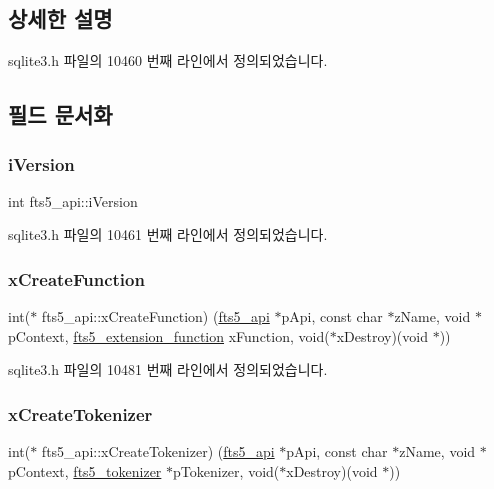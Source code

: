 \subsection{상세한 설명}


sqlite3.\+h 파일의 10460 번째 라인에서 정의되었습니다.



\subsection{필드 문서화}
\mbox{\label{structfts5__api_a3c338289abb33e1805da870172956a7c}} 
\subsubsection{\texorpdfstring{i\+Version}{iVersion}}
{\footnotesize\ttfamily int fts5\+\_\+api\+::i\+Version}



sqlite3.\+h 파일의 10461 번째 라인에서 정의되었습니다.

\mbox{\label{structfts5__api_acf1a0612be3b91b908f38ecbc6735d17}} 
\subsubsection{\texorpdfstring{x\+Create\+Function}{xCreateFunction}}
{\footnotesize\ttfamily int($\ast$ fts5\+\_\+api\+::x\+Create\+Function) (\hyperlink{structfts5__api}{fts5\+\_\+api} $\ast$p\+Api, const char $\ast$z\+Name, void $\ast$p\+Context, \hyperlink{sqlite3_8h_a8a1df7b5a066b194f490be5936e85c17}{fts5\+\_\+extension\+\_\+function} x\+Function, void($\ast$x\+Destroy)(void $\ast$))}



sqlite3.\+h 파일의 10481 번째 라인에서 정의되었습니다.

\mbox{\label{structfts5__api_a7fe3663f85eab512d5c461e1674da129}} 
\subsubsection{\texorpdfstring{x\+Create\+Tokenizer}{xCreateTokenizer}}
{\footnotesize\ttfamily int($\ast$ fts5\+\_\+api\+::x\+Create\+Tokenizer) (\hyperlink{structfts5__api}{fts5\+\_\+api} $\ast$p\+Api, const char $\ast$z\+Name, void $\ast$p\+Context, \hyperlink{structfts5__tokenizer}{fts5\+\_\+tokenizer} $\ast$p\+Tokenizer, void($\ast$x\+Destroy)(void $\ast$))}



